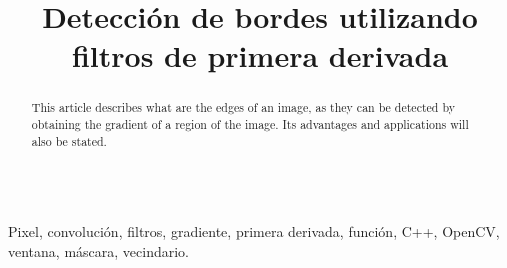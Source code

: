 \documentclass[conference]{IEEEtran}
\begin{document}
\title{ Detecci\'on de bordes utilizando filtros de primera derivada }
\author{
}

\maketitle
\renewcommand\abstractname{Abstract}
\begin{abstract}
This article describes what are the edges of an image, as they can be detected by obtaining the gradient of a region of the image. Its advantages and applications will also be stated. \\\\
\end{abstract}

\begin{IEEEkeywords}
Pixel, convoluci\'on, filtros, gradiente, primera derivada, funci\'on, C++, OpenCV, ventana, m\'ascara, vecindario.
\end{IEEEkeywords}

\IEEEpeerreviewmaketitle
\end{document}
